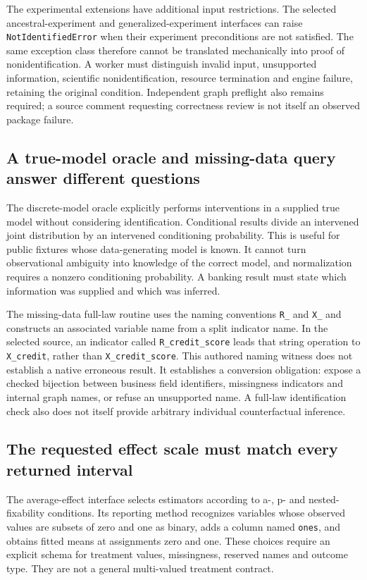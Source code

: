 The experimental extensions have additional input restrictions. The
selected ancestral-experiment and generalized-experiment interfaces can
raise \texttt{NotIdentifiedError} when their experiment preconditions are
not satisfied. The same exception class therefore cannot be translated
mechanically into proof of nonidentification. A worker must distinguish
invalid input, unsupported information, scientific nonidentification,
resource termination and engine failure, retaining the original condition.
Independent graph preflight also remains required; a source comment
requesting correctness review is not itself an observed package failure.
\citep{exec24_ananke_source}

\subsection{A true-model oracle and missing-data query answer different questions}
The discrete-model oracle explicitly performs interventions in a supplied
true model without considering identification. Conditional results divide
an intervened joint distribution by an intervened conditioning probability.
This is useful for public fixtures whose data-generating model is known.
It cannot turn observational ambiguity into knowledge of the correct model,
and normalization requires a nonzero conditioning probability. A banking
result must state which information was supplied and which was inferred.
\citep{exec24_ananke_source,exec24_ananke_choice}

The missing-data full-law routine uses the naming conventions
\texttt{R\_} and \texttt{X\_} and constructs an associated variable name
from a split indicator name. In the selected source, an indicator called
\texttt{R\_credit\_score} leads that string operation to
\texttt{X\_credit}, rather than \texttt{X\_credit\_score}.
This authored naming witness does not establish a native erroneous result.
It establishes a conversion obligation: expose a checked bijection between
business field identifiers, missingness indicators and internal graph
names, or refuse an unsupported name. A full-law identification check
also does not itself provide arbitrary individual counterfactual inference.
\citep{exec24_ananke_source,exec24_ananke_choice}

\subsection{The requested effect scale must match every returned interval}
The average-effect interface selects estimators according to a-, p- and
nested-fixability conditions. Its reporting method recognizes variables
whose observed values are subsets of zero and one as binary, adds a column
named \texttt{ones}, and obtains fitted means at assignments zero and one.
These choices require an explicit schema for treatment values, missingness,
reserved names and outcome type. They are not a general multi-valued
treatment contract.~\citep{exec24_ananke_source}

